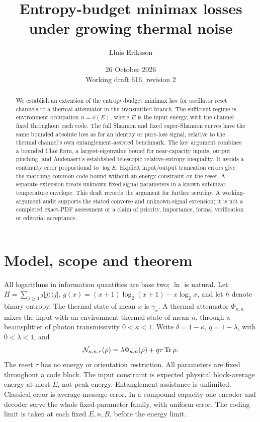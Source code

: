 \documentclass[11pt]{article}
\title{Entropy-budget minimax losses under growing thermal noise}
\author{Lluis Eriksson}
\date{26 October 2026\\\small Working draft 616, revision 2}
\newcommand{\Tr}{\operatorname{Tr}}
\newcommand{\PhiT}{\Phi_{\kappa,n}}
\begin{document}
\maketitle
\begin{abstract}
We establish an extension of the entropy-budget minimax law for oscillator
reset channels to a thermal attenuator in the transmitted branch.
The sufficient regime is environment occupation \(n=o(E)\),
where \(E\) is the input energy, with the channel fixed throughout each
code. The full Shannon and fixed super-Shannon curves have
the same bounded absolute loss as for an identity or pure-loss signal,
relative to the thermal channel's own entanglement-assisted benchmark.
The key argument combines a bounded Choi form, a largest-eigenvalue bound
for near-capacity inputs, output pinching, and Audenaert's established
telescopic relative-entropy inequality. It avoids a continuity error
proportional to \(\log E\). Explicit input/output truncation errors give
the matching common-code bound without an energy constraint on the
reset. A separate extension treats unknown fixed signal parameters in
a known sublinear-temperature envelope.
This draft records the argument for further scrutiny.
A working-argument audit supports the stated converse and unknown-signal
extension; it is not a completed exact-PDF assessment or a claim of
priority, importance, formal verification or editorial acceptance.
\end{abstract}

\section{Model, scope and theorem}
All logarithms in information quantities are base two; \(\ln\) is natural.
Let \(H=\sum_{j\ge0}j|j\rangle\langle j|\),
\(g(x)=(x+1)\log_2(x+1)-x\log_2x\), and let \(h\) denote binary entropy.
The thermal state of mean \(x\) is \(\gamma_x\).
A thermal attenuator \(\PhiT\) mixes the input with an environment thermal
state of mean \(n\), through a beamsplitter of photon transmissivity
\(0<\kappa<1\). Write \(\delta=1-\kappa\), \(q=1-\lambda\), with
\(0<\lambda<1\), and
\[
 {\cal N}_{\kappa,n,\tau}(\rho)=\lambda\PhiT(\rho)+q\tau\Tr\rho.
\]
The reset \(\tau\) has no energy or orientation restriction.
All parameters are fixed throughout a code block. The input constraint
is expected physical block-average energy at most \(E\), not peak energy.
Entanglement assistance is unlimited. Classical error is average-message
error. In a compound capacity one encoder and decoder serve the whole
fixed-parameter family, with uniform error. The coding limit is taken
at each fixed \(E,n,B\), before the energy limit.
\end{document}
